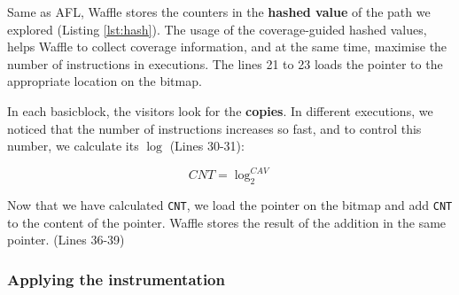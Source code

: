 Same as AFL, Waffle stores the counters in the \textbf{hashed value} of the path we explored (Listing \ref{lst:hash}). The usage of the coverage-guided hashed values, helps Waffle to collect coverage information, and at the same time, maximise the number of instructions in executions. The lines 21 to 23 loads the pointer to the appropriate location on the bitmap.

In each basicblock, the visitors look for the \textbf{copies}. In different executions, we noticed that the number of instructions increases so fast, and to control this number, we calculate its $\log$ (Lines 30-31):

\begin{equation}
  \label{eq:log}
  CNT = \log_{2}^{CAV} 
\end{equation}

Now that we have calculated \texttt{CNT}, we load the pointer on the bitmap and add \texttt{CNT} to the content of the pointer. Waffle stores the result of the addition in the same pointer. (Lines 36-39)

\subsubsection*{Applying the instrumentation}

